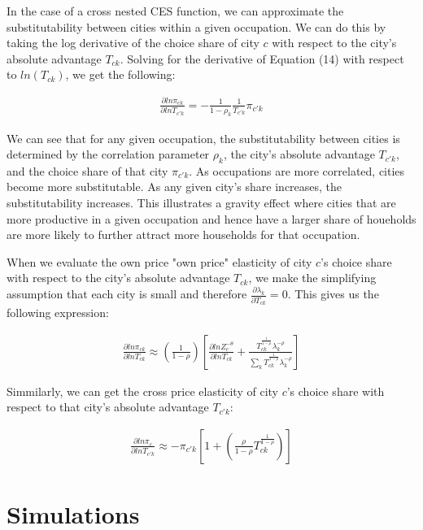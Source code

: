 \documentclass[10pt]{article}
\begin{document}
In the case of a cross nested CES function, we can approximate the substitutability between cities within a given occupation. We can do this by taking the log derivative of the choice share of city $c$ with respect to the city's absolute advantage $T_{ck}$. Solving for the derivative of Equation (14) with respect to $ln (T_{ck})$, we get the following:

\begin{align}
    \frac{\partial ln \pi_{ck}}{\partial ln T_{c'k}} = - \frac{1}{1 - \rho_k} \frac{1}{T_{c'k}} \pi_{c'k}
\end{align}

We can see that for any given occupation, the substitutability between cities is determined by the correlation parameter $\rho_k$, the city's absolute advantage $T_{c'k}$, and the choice share of that city $\pi_{c'k}$. As occupations are more correlated, cities become more substitutable. As any given city's share increases, the substitutability increases. This illustrates a gravity effect where cities that are more productive in a given occupation and hence have a larger share of houeholds are more likely to further attract more households for that occupation.

When we evaluate the own price "own price" elasticity of city $c$'s choice share with respect to the city's absolute advantage $T_{ck}$, we make the simplifying assumption that each city is small and therefore $\frac{\partial \lambda_k}{\partial T_{ck}} = 0$. This gives us the following expression:

\begin{align}
    \frac{\partial ln \pi_{ck}}{\partial ln T_{ck}} \approx \left( \frac{1}{1 - \rho} \right) \left[ \frac{\partial ln Z_c^{- \theta}}{\partial ln T_{ck}} +\frac{T_{ck}^{\frac{1}{1 - \rho}} \lambda_k^{- \rho}}{\sum_{k}^{} T_{ck}^{\frac{1}{1 - \rho}} \lambda_k^{-\rho}} \right]
\end{align}

Simmilarly, we can get the cross price elasticity of city $c$'s choice share with respect to that city's absolute advantage $T_{c'k}$:

\begin{align}
    \frac{\partial ln \pi_c}{\partial ln T_{c'k}} \approx - \pi_{c'k} \left[ 1 + \left( \frac{\rho}{1 - \rho} T_{ck}^{\frac{1}{1 - \rho}} \right) \right]
\end{align}

\section{Simulations}
\end{document}
